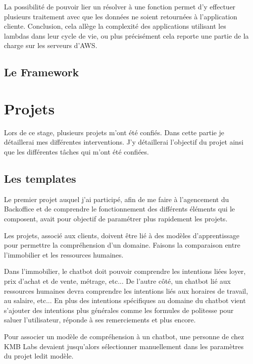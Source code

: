\documentclass[12pt,a4paper,twoside]{scrreprt}
\begin{document}
La possibilité de pouvoir lier un résolver à une fonction permet d'y effectuer plusieurs traitement avec que les données ne soient retournées à l'application cliente. Conclusion, cela allège la complexité des applications utilisant les lambdas dans leur cycle de vie, ou plus précisément cela reporte une partie de la charge sur les serveurs d'AWS.

\section{Le Framework}

\chapter{Projets}

Lors de ce stage, plusieurs projets m'ont été confiés. Dans cette partie je détaillerai mes différentes interventions. J'y détaillerai l'objectif du projet ainsi que les différentes tâches qui m'ont été confiées.

\section{Les templates}

Le premier projet auquel j'ai participé, afin de me faire à l'agencement du Backoffice et de comprendre le fonctionnement des différents éléments qui le composent, avait pour objectif de paramétrer plus rapidement les projets.

Les projets, associé aux clients, doivent être lié à des modèles d'apprentissage pour permettre la compréhension d'un domaine. Faisons la comparaison entre l'immobilier et les ressources humaines.

Dans l'immobilier, le chatbot doit pouvoir comprendre les intentions liées loyer, prix d'achat et de vente, métrage, etc... De l'autre côté, un chatbot lié aux ressources humaines devra comprendre les intentions liés aux horaires de travail, au salaire, etc... En plus des intentions spécifiques au domaine du chatbot vient s'ajouter des intentions plus générales comme les formules de politesse pour saluer l'utilisateur, réponde à ses remerciements et plus encore.


\begin{problem}
Pour associer un modèle de compréhension à un chatbot, une personne de chez KMB Labs devaient jusqu'alors sélectionner manuellement dans les paramètres du projet ledit modèle.
\end{problem}
\end{document}
